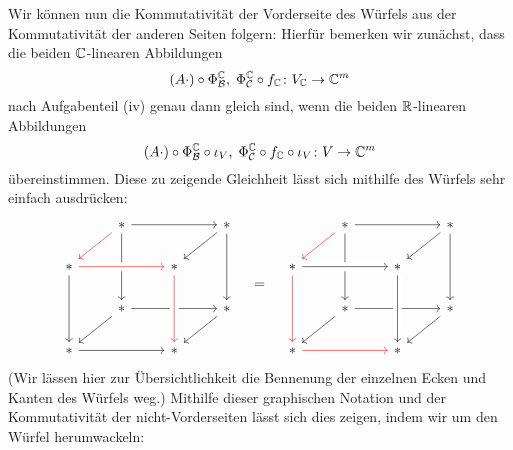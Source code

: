 \documentclass[a4paper,10pt]{article}
\begin{document}
Wir können nun die Kommutativität der Vorderseite des Würfels aus der Kommutativität der anderen Seiten folgern:
Hierfür bemerken wir zunächst, dass die beiden $\mathbb{C}$-linearen Abbildungen
\[
  (A \cdot) \circ \Phi^{\mathbb{C}}_{\mathcal{B}}, \;
  \Phi^{\mathbb{C}}_{\mathcal{C}} \circ f_{\mathbb{C}}
  \colon
  V_{\mathbb{C}} \to \mathbb{C}^m
\]
nach Aufgabenteil (iv) genau dann gleich sind, wenn die beiden $\mathbb{R}$-linearen Abbildungen
\[
    (A \cdot) \circ \Phi^{\mathbb{C}}_{\mathcal{B}} \circ \iota_V, \;
    \Phi^{\mathbb{C}}_{\mathcal{C}} \circ f_{\mathbb{C}} \circ \iota_V
    \colon
    V \to \mathbb{C}^m
\]
übereinstimmen.
Diese zu zeigende Gleichheit lässt sich mithilfe des Würfels sehr einfach ausdrücken:
\[
  \begin{tikzcd}
      {}
    & *
      \arrow[rr]
      \arrow[ld, red]
      \arrow[dd]
    & {}
    & *
      \arrow[ld]
      \arrow[dd]
    \\
      *
      \arrow[rr, crossing over, red]
      \arrow[dd]
    & {}
    & *
      \arrow[dd]
    & {}
    \\
      {}
    & *
      \arrow[rr]
      \arrow[ld]
    & {}
    & *
      \arrow[ld]
    \\
      *
      \arrow[rr]
    & {}
    & *
      \arrow[from=uu, crossing over, red]
    & {}
  \end{tikzcd}
  \quad=\quad
  \begin{tikzcd}
      {}
    & *
      \arrow[rr]
      \arrow[ld, red]
      \arrow[dd]
    & {}
    & *
      \arrow[ld]
      \arrow[dd]
    \\
      *
      \arrow[rr, crossing over]
      \arrow[dd, red]
    & {}
    & *
      \arrow[dd]
    & {}
    \\
      {}
    & *
      \arrow[rr]
      \arrow[ld]
    & {}
    & *
      \arrow[ld]
    \\
      *
      \arrow[rr, red]
    & {}
    & *
      \arrow[from=uu, crossing over]
    & {}
  \end{tikzcd}
\]
(Wir lässen hier zur Übersichtlichkeit die Bennenung der einzelnen Ecken und Kanten des Würfels weg.)
Mithilfe dieser graphischen Notation und der Kommutativität der nicht-Vorderseiten lässt sich dies zeigen, indem wir um den Würfel herumwackeln:
\end{document}
